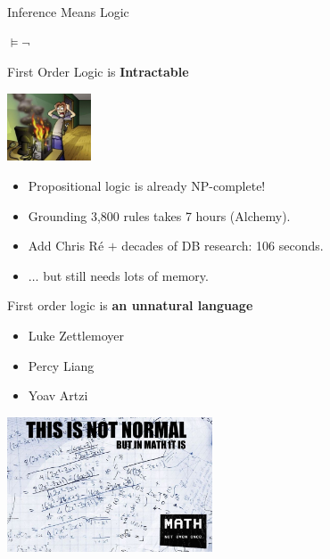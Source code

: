\begin{frame}{Inference Means Logic}
\begin{center}
 \textbf{$\vDash \lnot$} 
\end{center}
\end{frame}

\begin{frame}{First Order Logic is \textbf{Intractable}}
\begin{center}
  \includegraphics[height=2cm]{../img/overheating.jpg}
\end{center}

\begin{itemize}
  \item Propositional logic is already NP-complete!
\end{itemize}
\vspace{1ex}
\pause

\begin{itemize}
  \item Grounding 3,800 rules takes 7 hours (Alchemy).
  \pause
  \item Add Chris R\'{e} $+$ decades of DB research: 106 seconds.
  \item $\dots$ but still needs lots of memory.
\end{itemize}

\end{frame}

\begin{frame}{First order logic is \textbf{an unnatural language}}

\begin{itemize}
\item[\checkmark] Luke Zettlemoyer
\item[\checkmark] Percy Liang
\item[\checkmark] Yoav Artzi
\end{itemize}
\vspace{1ex}

\begin{center}
  \includegraphics[height=4cm]{../img/math.jpg}
\end{center}
\end{frame}


